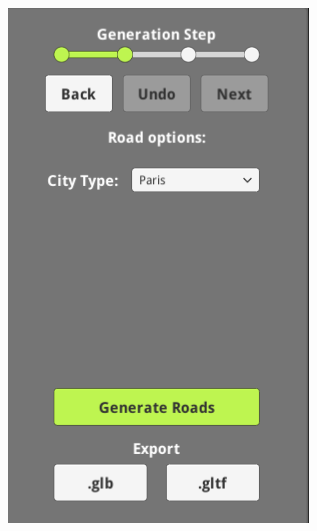 \begin{figure}[H]
\begin{subfigure}[b]{0.24\textwidth}
    \includegraphics[width=\textwidth]{figure/results/gui2.png}
  \end{subfigure}
  \begin{subfigure}[b]{0.24\textwidth}

\end{subfigure}
\end{figure}
